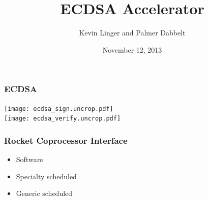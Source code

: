 \documentclass{beamer}
\title{ECDSA Accelerator}
\author{Kevin Linger and Palmer Dabbelt}
\date{November 12, 2013}
\begin{document}
\maketitle

\begin{frame}
  \frametitle{ECDSA}

  \begin{center}
    \begin{multicols}{2}
      \texttt{[image: ecdsa\_sign.uncrop.pdf]} \\
      \texttt{[image: ecdsa\_verify.uncrop.pdf]} \\
    \end{multicols}
  \end{center}
\end{frame}

\begin{frame}
  \frametitle{Rocket Coprocessor Interface}

  \begin{multicols}{2}
    \begin{center}
      
    \end{center}

    \setcounter{beamerpauses}{3}
    \begin{itemize}
      \item<2-> Software
      \item<7-> Specialty scheduled
      \item<13-> Generic scheduled
    \end{itemize}
  \end{multicols}
\end{frame}
\end{document}

